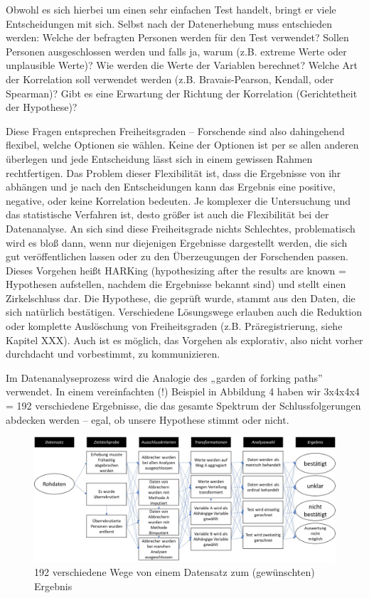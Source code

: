 \documentclass[
  letterpaper,
  DIV=11,
  numbers=noendperiod]{scrreprt}
\begin{document}
Obwohl es sich hierbei um einen sehr einfachen Test handelt, bringt er
viele Entscheidungen mit sich. Selbst nach der Datenerhebung muss
entschieden werden: Welche der befragten Personen werden für den Test
verwendet? Sollen Personen ausgeschlossen werden und falls ja, warum
(z.B. extreme Werte oder unplausible Werte)? Wie werden die Werte der
Variablen berechnet? Welche Art der Korrelation soll verwendet werden
(z.B. Bravais-Pearson, Kendall, oder Spearman)? Gibt es eine Erwartung
der Richtung der Korrelation (Gerichtetheit der Hypothese)?

Diese Fragen entsprechen Freiheitsgraden -- Forschende sind also
dahingehend flexibel, welche Optionen sie wählen. Keine der Optionen ist
per se allen anderen überlegen und jede Entscheidung lässt sich in einem
gewissen Rahmen rechtfertigen. Das Problem dieser Flexibilität ist, dass
die Ergebnisse von ihr abhängen und je nach den Entscheidungen kann das
Ergebnis eine positive, negative, oder keine Korrelation bedeuten. Je
komplexer die Untersuchung und das statistische Verfahren ist, desto
größer ist auch die Flexibilität bei der Datenanalyse. An sich sind
diese Freiheitsgrade nichts Schlechtes, problematisch wird es bloß dann,
wenn nur diejenigen Ergebnisse dargestellt werden, die sich gut
veröffentlichen lassen oder zu den Überzeugungen der Forschenden passen.
Dieses Vorgehen heißt HARKing (hypothesizing after the results are known
= Hypothesen aufstellen, nachdem die Ergebnisse bekannt sind) und stellt
einen Zirkelschluss dar. Die Hypothese, die geprüft wurde, stammt aus
den Daten, die sich natürlich bestätigen. Verschiedene Lösungswege
erlauben auch die Reduktion oder komplette Auslöschung von
Freiheitsgraden (z.B. Präregistrierung, siehe Kapitel XXX). Auch ist es
möglich, das Vorgehen als explorativ, also nicht vorher durchdacht und
vorbestimmt, zu kommunizieren.

Im Datenanalyseprozess wird die Analogie des „garden of forking paths''
verwendet. In einem vereinfachten (!) Beispiel in Abbildung 4 haben wir
3x4x4x4 = 192 verschiedene Ergebnisse, die das gesamte Spektrum der
Schlussfolgerungen abdecken werden -- egal, ob unsere Hypothese stimmt
oder nicht.

\begin{figure}[H]

{\centering \includegraphics{images/gardenofforkingpaths.jpg}

}

\caption{192 verschiedene Wege von einem Datensatz zum (gewünschten)
Ergebnis}

\end{figure}%
\end{document}
